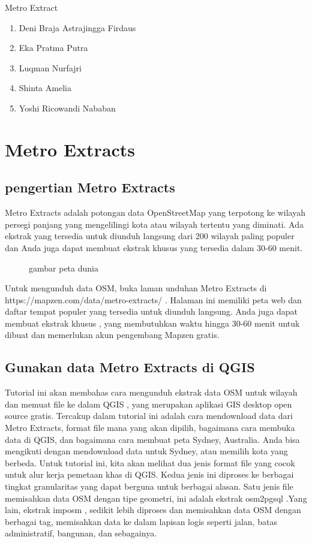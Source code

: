 Metro Extract
\begin {enumerate}
\item Deni Braja Astrajingga Firdaus
\item Eka Pratma Putra
\item Luqman Nurfajri
\item Shinta Amelia
\item Yoshi Ricowandi Nababan
\end {enumerate}
\section {Metro Extracts}
\subsection {pengertian Metro Extracts}
Metro Extracts adalah potongan data OpenStreetMap yang terpotong ke wilayah persegi panjang yang mengelilingi kota atau wilayah tertentu yang diminati. Ada ekstrak yang tersedia untuk diunduh langsung dari 200 wilayah paling populer dan Anda juga dapat membuat ekstrak khusus yang tersedia dalam 30-60 menit.
\begin{figure}[ht]
\caption{gambar peta dunia}
\label {petadunia}
\end{figure}
Untuk mengunduh data OSM, buka laman unduhan Metro Extracts di https://mapzen.com/data/metro-extracts/ . Halaman ini memiliki peta web dan daftar tempat populer yang tersedia untuk diunduh langsung. Anda juga dapat membuat ekstrak khusus , yang membutuhkan waktu hingga 30-60 menit untuk dibuat dan memerlukan akun pengembang Mapzen gratis.
\subsection {Gunakan data Metro Extracts di QGIS}

Tutorial ini akan membahas cara mengunduh ekstrak data OSM untuk wilayah dan memuat file ke dalam QGIS , yang merupakan aplikasi GIS desktop open source gratis. Tercakup dalam tutorial ini adalah cara mendownload data dari Metro Extracts, format file mana yang akan dipilih, bagaimana cara membuka data di QGIS, dan bagaimana cara membuat peta Sydney, Australia. Anda bisa mengikuti dengan mendownload data untuk Sydney, atau memilih kota yang berbeda.
Untuk tutorial ini, kita akan melihat dua jenis format file yang cocok untuk alur kerja pemetaan khas di QGIS. Kedua jenis ini diproses ke berbagai tingkat granularitas yang dapat berguna untuk berbagai alasan. Satu jenis file memisahkan data OSM dengan tipe geometri, ini adalah ekstrak osm2pgsql .Yang lain, ekstrak imposm , sedikit lebih diproses dan memisahkan data OSM dengan berbagai tag, memisahkan data ke dalam lapisan logis seperti jalan, batas administratif, bangunan, dan sebagainya.
